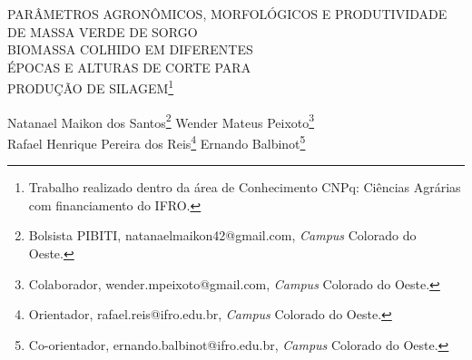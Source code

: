 \documentclass[article,12pt,onesidea,4paper,english,brazil]{abntex2}
\begin{document}
	
	
	\frenchspacing 
	
	\begin{center}
		\LARGE PARÂMETROS AGRONÔMICOS, MORFOLÓGICOS E PRODUTIVIDADE DE
		MASSA VERDE DE SORGO \\BIOMASSA COLHIDO EM DIFERENTES\\ ÉPOCAS E
		ALTURAS DE CORTE PARA\\ PRODUÇÃO DE SILAGEM\footnote{Trabalho realizado dentro da área de Conhecimento CNPq: Ciências Agrárias com financiamento do IFRO.}
		
		\normalsize
		Natanael Maikon dos Santos\footnote{Bolsista PIBITI, natanaelmaikon42@gmail.com, \textit{Campus} Colorado do Oeste.} 
		Wender Mateus Peixoto\footnote{Colaborador, wender.mpeixoto@gmail.com, \textit{Campus} Colorado do Oeste.} \\
		Rafael Henrique Pereira dos Reis\footnote{Orientador, rafael.reis@ifro.edu.br, \textit{Campus} Colorado do Oeste.} 
		Ernando Balbinot\footnote{Co-orientador, ernando.balbinot@ifro.edu.br, \textit{Campus} Colorado do Oeste.} 
	\end{center}
	
\end{document}
